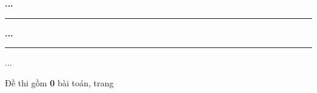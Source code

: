 \providecommand{\TotalProblemCount}{0}

\noindent
\begin{minipage}[t][2.25cm][t]{0.36\textwidth}
    \centering
    \textbf{...}\par
    \rule{\linewidth}{0.4pt}\par

    \vspace{8pt}

    {
        \setlength{\fboxrule}{0.35pt}
        \setlength{\fboxsep}{2.5pt}
            \parbox[c][0.82cm][c]{0.94\linewidth}{%
                \centering
                {
                    \setlength{\fboxrule}{0.35pt}
                    \setlength{\fboxsep}{6pt}
                }
            }%
    }
\end{minipage}
\hfill
\begin{minipage}[t][2.25cm][t]{0.60\textwidth}
    \centering
    \textbf{...}\par
    \rule{\linewidth}{0.4pt}\par

    \vspace{4pt}
    ...

    Đề thi gồm \textbf{\TotalProblemCount} bài toán, \textbf{\pageref{LastPage}} trang\par
\end{minipage}

\vspace{0.6cm}

